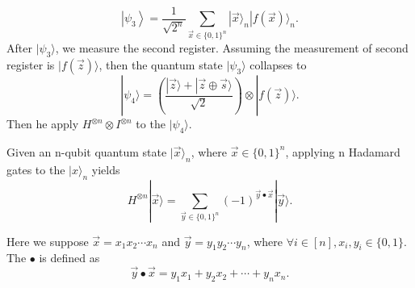 \begin{equation}
    \left|\psi_3\right\rangle=\frac{1}{\sqrt{2^n}} \sum_{\vec{x} \in\{0,1\}^n}|\vec{x}\rangle_n|f(\vec{x})\rangle_n.
\end{equation}
After $|\psi_3\rangle$, we measure the second register. Assuming the measurement of second register is $|f(\vec{z})\rangle$, then the quantum state $|\psi_3\rangle$ collapses to
\begin{equation}
    |\psi_4\rangle = \left(\frac{|\vec{z}\rangle+|\vec{z} \oplus \vec{s}\rangle}{\sqrt{2}}\right) \otimes|f(\vec{z})\rangle.
\end{equation}
Then he apply $H^{\otimes n} \otimes I^{\otimes n}$ to the $|\psi_4\rangle$. 

\begin{remark}
Given an n-qubit quantum state $|\vec{x}\rangle_n$, where $\vec{x} \in \{0,1\}^n$, applying n Hadamard gates to the $|x\rangle_n$ yields 
\begin{equation}
    H^{\otimes n}|\vec{x}\rangle=\sum_{\vec{y} \in\{0,1\}^n}(-1)^{\vec{y} \bullet \vec{x}}|\vec{y}\rangle.
\end{equation}

Here we suppose $\vec{x} = x_1 x_2 \cdots x_n$ and $\vec{y} = y_1 y_2 \cdots y_n$, where $\forall i \in [n],x_i,y_i \in \{0,1\}$. The $\bullet$ is defined as 
\begin{equation}
    \vec{y} \bullet \vec{x} = y_1 x_1 + y_2 x_2 + \cdots + y_n x_n.
\end{equation}
\end{remark}

